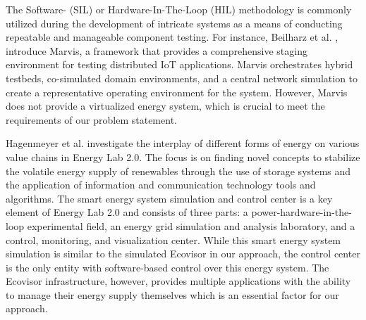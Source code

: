 The Software- (SIL) or Hardware-In-The-Loop (HIL) methodology is commonly
utilized during the development of intricate systems as a means of conducting
repeatable and manageable component testing. For instance, Beilharz et al.
\cite{beilharz2021}, introduce Marvis, a framework that provides a comprehensive
staging environment for testing distributed IoT applications. Marvis
orchestrates hybrid testbeds, co-simulated domain environments, and a central
network simulation to create a representative operating environment for the
system. However, Marvis does not provide a virtualized energy system, which is
crucial to meet the requirements of our problem statement.

Hagenmeyer et al. \cite{hagenmeyer2016} investigate the interplay of different
forms of energy on various value chains in Energy Lab 2.0. The focus is on
finding novel concepts to stabilize the volatile energy supply of renewables
through the use of storage systems and the application of information and
communication technology tools and algorithms. The smart energy system
simulation and control center is a key element of Energy Lab 2.0 and consists of
three parts: a power-hardware-in-the-loop experimental field, an energy grid
simulation and analysis laboratory, and a control, monitoring, and visualization
center. While this smart energy system simulation is similar to the simulated
Ecovisor in our approach, the control center is the only entity with
software-based control over this energy system. The Ecovisor infrastructure,
however, provides multiple applications with the ability to manage their energy
supply themselves which is an essential factor for our approach.
